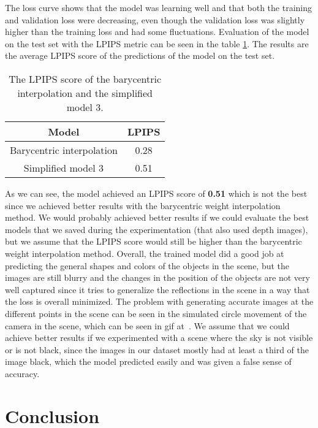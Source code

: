 The loss curve shows that the model was learning well and that both the training and validation loss were decreasing, even though the validation loss was slightly higher than the training loss and had some fluctuations.
Evaluation of the model on the test set with the LPIPS metric can be seen in the table \ref{table:lpips_bilinear}. 
The results are the average LPIPS score of the predictions of the model on the test set.

\begin{table}[htb]
    \centering
    \begin{tabular}{|c|c|} \hline
    Model & LPIPS \\ \hline
    Barycentric interpolation & 0.28 \\ \hline
    Simplified model 3 & 0.51 \\ \hline
    \end{tabular}
    \caption{The LPIPS score of the barycentric interpolation and the simplified model 3.}
    \label{table:lpips_bilinear}
\end{table}

As we can see, the model achieved an LPIPS score of \textbf{0.51} which is not the best since we achieved better results with the barycentric weight interpolation method.
We would probably achieved better results if we could evaluate the best models that we saved during the experimentation (that also used depth images), but we assume that the LPIPS score would still be higher than the barycentric weight interpolation method.
Overall, the trained model did a good job at predicting the general shapes and colors of the objects in the scene, but the images are still blurry and the changes in the position of the objects are not very well captured since it tries to generalize the reflections in the scene in a way that the loss is overall minimized. The problem with generating accurate images at the different points in the scene can be seen in the simulated circle movement of the camera in the scene, which can be seen in gif at~\cite{MrakJakob}.
We assume that we could achieve better results if we experimented with a scene where the sky is not visible or is not black, since the images in our dataset mostly had at least a third of the image black, which the model predicted easily and was given a false sense of accuracy. 

\section{Conclusion}

